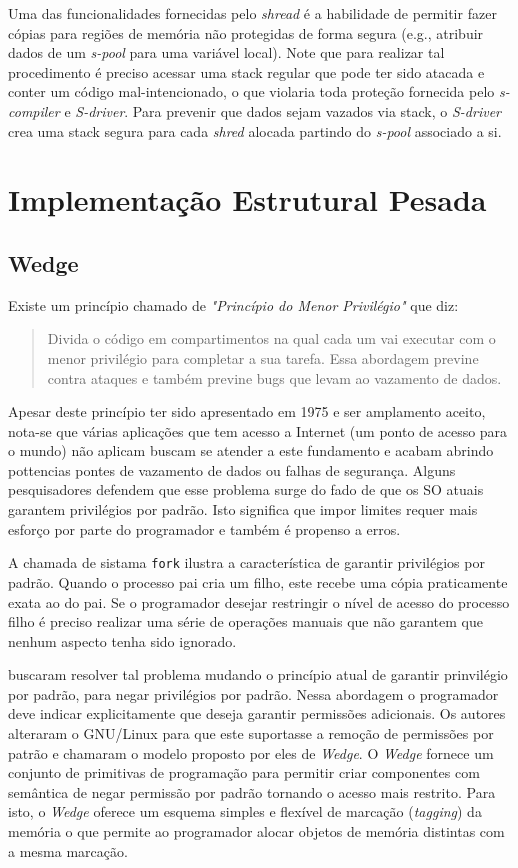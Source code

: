 Uma das funcionalidades fornecidas pelo \emph{shread} é a habilidade de
permitir fazer cópias para regiões de memória não protegidas de forma segura
(e.g., atribuir dados de um \emph{s-pool} para uma variável local). Note que
para realizar tal procedimento é preciso acessar uma stack regular que pode ter
sido atacada e conter um código mal-intencionado, o que violaria toda proteção
fornecida pelo \emph{s-compiler} e \emph{S-driver}. Para prevenir que dados
sejam vazados via stack, o \emph{S-driver} crea uma stack segura para cada
\emph{shred} alocada partindo do \emph{s-pool} associado a si.

\section{Implementação Estrutural Pesada}

\subsection{Wedge}

Existe um princípio chamado de \emph{"Princípio do Menor Privilégio"} que diz:

\begin{quote}
Divida o código em compartimentos na qual cada um vai executar com o menor
privilégio para completar a sua tarefa. Essa abordagem previne contra ataques
e também previne bugs que levam ao vazamento de dados.
\citep{protectionprinciple}
\end{quote}

Apesar deste princípio ter sido apresentado em 1975 e ser amplamento aceito,
nota-se que várias aplicações que tem acesso a Internet (um ponto de acesso
para o mundo) não aplicam buscam se atender a este fundamento e acabam abrindo
pottencias pontes de vazamento de dados ou falhas de segurança. Alguns
pesquisadores defendem que esse problema surge do fado de que os SO atuais
garantem privilégios por padrão. Isto significa que impor limites requer mais
esforço por parte do programador e também é propenso a erros.

A chamada de sistama \texttt{fork} ilustra a característica de garantir
privilégios por padrão. Quando o processo pai cria um filho, este recebe uma
cópia praticamente exata ao do pai. Se o programador desejar restringir o
nível de acesso do processo filho é preciso realizar uma série de operações
manuais que não garantem que nenhum aspecto tenha sido ignorado.

\cite{wedge} buscaram resolver tal problema mudando o princípio atual de
garantir prinvilégio por padrão, para negar privilégios por padrão. Nessa
abordagem o programador deve indicar explicitamente que deseja garantir
permissões adicionais. Os autores alteraram o GNU/Linux para que este
suportasse a remoção de permissões por patrão e chamaram o modelo proposto por
eles de \emph{Wedge}. O \emph{Wedge} fornece um conjunto de primitivas de
programação para permitir criar componentes com semântica de negar permissão
por padrão tornando o acesso mais restrito. Para isto, o \emph{Wedge} oferece
um esquema simples e flexível de marcação (\emph{tagging}) da memória o que
permite ao programador alocar objetos de memória distintas com a mesma
marcação.

